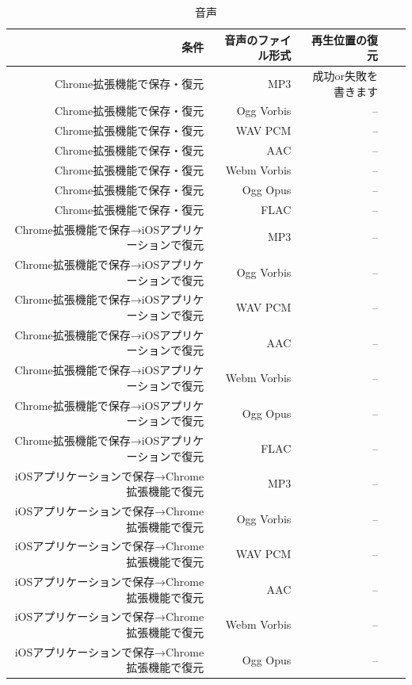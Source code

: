 \begin{table}[htbp]
  \caption{音声}
  \label{tb:evl-result-audio}
  \begin{center}
    \begin{tabular}{rrrrr}
      \hline
      条件 & 音声のファイル形式 & 再生位置の復元 \\ \hline \hline
      Chrome拡張機能で保存・復元 & MP3 & 成功or失敗を書きます  \\ \hline
      Chrome拡張機能で保存・復元 & Ogg Vorbis & --  \\ \hline
      Chrome拡張機能で保存・復元 & WAV PCM & --  \\ \hline
      Chrome拡張機能で保存・復元 & AAC & --  \\ \hline
      Chrome拡張機能で保存・復元 & Webm Vorbis & --  \\ \hline
      Chrome拡張機能で保存・復元 & Ogg Opus & --  \\ \hline
      Chrome拡張機能で保存・復元 & FLAC & --  \\ \hline
      Chrome拡張機能で保存→iOSアプリケーションで復元 & MP3 & --  \\ \hline
      Chrome拡張機能で保存→iOSアプリケーションで復元 & Ogg Vorbis & --  \\ \hline
      Chrome拡張機能で保存→iOSアプリケーションで復元 & WAV PCM & --  \\ \hline
      Chrome拡張機能で保存→iOSアプリケーションで復元 & AAC & --  \\ \hline
      Chrome拡張機能で保存→iOSアプリケーションで復元 & Webm Vorbis & --  \\ \hline
      Chrome拡張機能で保存→iOSアプリケーションで復元 & Ogg Opus & --  \\ \hline
      Chrome拡張機能で保存→iOSアプリケーションで復元 & FLAC & --  \\ \hline
      iOSアプリケーションで保存→Chrome拡張機能で復元 & MP3 & --  \\ \hline
      iOSアプリケーションで保存→Chrome拡張機能で復元 & Ogg Vorbis & --  \\ \hline
      iOSアプリケーションで保存→Chrome拡張機能で復元 & WAV PCM & --  \\ \hline
      iOSアプリケーションで保存→Chrome拡張機能で復元 & AAC & --  \\ \hline
      iOSアプリケーションで保存→Chrome拡張機能で復元 & Webm Vorbis & --  \\ \hline
      iOSアプリケーションで保存→Chrome拡張機能で復元 & Ogg Opus & --  \\ \hline

\end{tabular}
\end{center}
\end{table}
